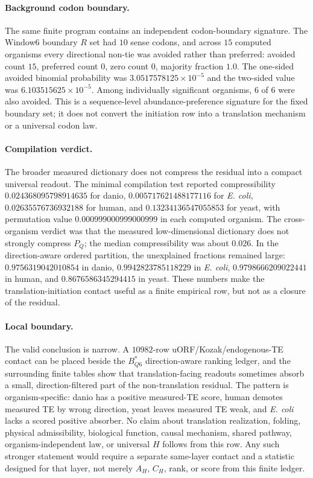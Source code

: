 \paragraph{Background codon boundary.}
The same finite program contains an independent codon-boundary signature.  The Window6 boundary $R$ set had $10$ sense codons, and across $15$ computed organisms every directional non-tie was avoided rather than preferred: avoided count $15$, preferred count $0$, zero count $0$, majority fraction $1.0$.  The one-sided avoided binomial probability was $3.0517578125\times 10^{-5}$ and the two-sided value was $6.103515625\times 10^{-5}$.  Among individually significant organisms, $6$ of $6$ were also avoided.  This is a sequence-level abundance-preference signature for the fixed boundary set; it does not convert the initiation row into a translation mechanism or a universal codon law.

\paragraph{Compilation verdict.}
The broader measured dictionary does not compress the residual into a compact universal readout.  The minimal compilation test reported compressibility $0.024368095798914635$ for danio, $0.005717621488177116$ for \emph{E. coli}, $0.02635576736932188$ for human, and $0.13234136547055853$ for yeast, with permutation value $0.000999000999000999$ in each computed organism.  The cross-organism verdict was that the measured low-dimensional dictionary does not strongly compress $P_Q$; the median compressibility was about $0.026$.  In the direction-aware ordered partition, the unexplained fractions remained large: $0.9756319042010854$ in danio, $0.9942823785118229$ in \emph{E. coli}, $0.9798666209022441$ in human, and $0.8676586345294415$ in yeast.  These numbers make the translation-initiation contact useful as a finite empirical row, but not as a closure of the residual.

\paragraph{Local boundary.}
The valid conclusion is narrow.  A $10982$-row uORF/Kozak/endogenous-TE contact can be placed beside the $B^*_{Q6}$ direction-aware ranking ledger, and the surrounding finite tables show that translation-facing readouts sometimes absorb a small, direction-filtered part of the non-translation residual.  The pattern is organism-specific: danio has a positive measured-TE score, human demotes measured TE by wrong direction, yeast leaves measured TE weak, and \emph{E. coli} lacks a scored positive absorber.  No claim about translation realization, folding, physical admissibility, biological function, causal mechanism, shared pathway, organism-independent law, or universal $H$ follows from this row.  Any such stronger statement would require a separate same-layer contact and a statistic designed for that layer, not merely $A_H$, $C_H$, rank, or score from this finite ledger.